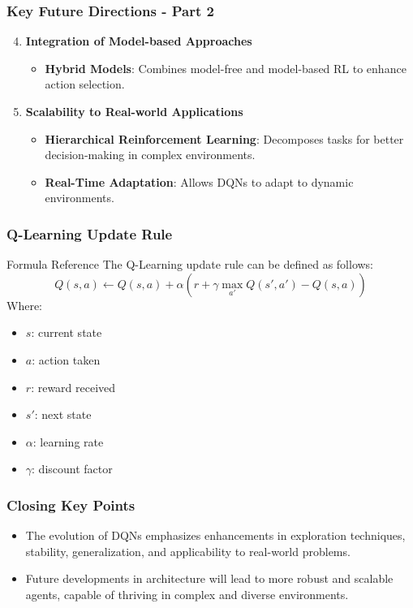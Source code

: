 \documentclass[aspectratio=169]{beamer}
\begin{document}
\begin{frame}[fragile]
    \frametitle{Key Future Directions - Part 2}
    \begin{enumerate}\setcounter{enumi}{3}
        \item \textbf{Integration of Model-based Approaches}
        \begin{itemize}
            \item \textbf{Hybrid Models}: Combines model-free and model-based RL to enhance action selection.
        \end{itemize}
        \item \textbf{Scalability to Real-world Applications}
        \begin{itemize}
            \item \textbf{Hierarchical Reinforcement Learning}: Decomposes tasks for better decision-making in complex environments.
            \item \textbf{Real-Time Adaptation}: Allows DQNs to adapt to dynamic environments.
        \end{itemize}
    \end{enumerate}
\end{frame}

\begin{frame}[fragile]
    \frametitle{Q-Learning Update Rule}
    \begin{block}{Formula Reference}
        The Q-Learning update rule can be defined as follows:
        \begin{equation}
        Q(s, a) \leftarrow Q(s, a) + \alpha \left( r + \gamma \max_{a'} Q(s', a') - Q(s, a) \right)
        \end{equation}
    Where:
    \begin{itemize}
        \item $s$: current state
        \item $a$: action taken
        \item $r$: reward received
        \item $s'$: next state
        \item $\alpha$: learning rate
        \item $\gamma$: discount factor
    \end{itemize}
    \end{block}
\end{frame}

\begin{frame}[fragile]
    \frametitle{Closing Key Points}
    \begin{itemize}
        \item The evolution of DQNs emphasizes enhancements in exploration techniques, stability, generalization, and applicability to real-world problems.
        \item Future developments in architecture will lead to more robust and scalable agents, capable of thriving in complex and diverse environments.
    \end{itemize}
\end{frame}
\end{document}
